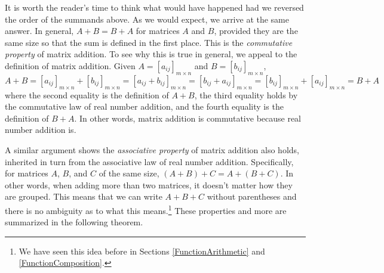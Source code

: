 \documentclass{ximera}
\begin{document}
It is worth the reader's time to think what would have happened had we reversed the order of the summands above.  As we would expect, we arrive at the same answer.  In general, $A+B = B+A$ for matrices $A$ and $B$, provided they are the same size so that the sum is defined in the first place.  This is the \textit{commutative property} of matrix addition.  To see why this is true in general, we appeal to the definition of matrix addition.  Given $A =\left[a_{ij}\right]_{m \times n}$ and $B =\left[b_{ij}\right]_{m \times n}$, \[A + B = \left[a_{ij}\right]_{m \times n} + \left[b_{ij}\right]_{m \times n} = \left[ a_{ij} + b_{ij} \right]_{m \times n} = \left[ b_{ij} + a_{ij} \right]_{m \times n} = \left[b_{ij}\right]_{m \times n} + \left[a_{ij}\right]_{m \times n} =B+A\] where the second equality is the definition of $A+B$, the third equality holds by the commutative law of real number addition, and the fourth equality is the definition of $B+A$.  In other words, matrix addition is commutative because real number addition is.  

A similar argument shows the \textit{associative property} of matrix addition also holds, inherited in turn from the associative law of real number addition.  Specifically, for matrices $A$, $B$, and $C$ of the same size, $(A+B)+C = A+(B+C)$.  In other words, when adding more than two matrices, it doesn't matter how they are grouped.  This means that we can write $A+B+C$ without parentheses and there is no ambiguity as to what this means.\footnote{We have seen this idea before in Sections \ref{FunctionArithmetic} and \ref{FunctionComposition}.} These properties and more are summarized in the following theorem.
\end{document}
